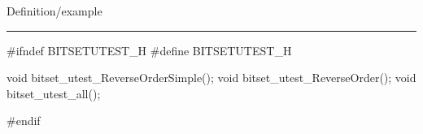 
Definition/example

\bigskip
\hrule
\code
#ifndef BITSETUTEST_H
#define BITSETUTEST_H
\endcode

\code

void bitset_utest_ReverseOrderSimple();
void bitset_utest_ReverseOrder();
void bitset_utest_all();

#endif
\endcode
